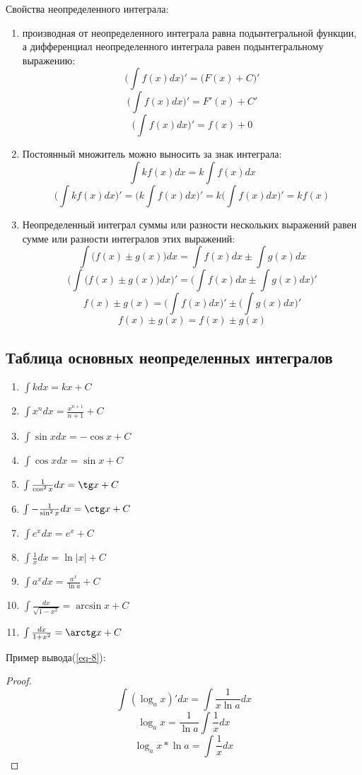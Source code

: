 \documentclass[12pt,a4paper]{article}
\begin{document}
Свойства неопределенного интеграла:
\begin{enumerate}
\item{производная от неопределенного интеграла равна подынтегральной функции, а дифференциал неопределенного интеграла равен подынтегральному выражению:
\[ \Big(\int f(x)dx \Big)' = \big( F(x) + C \big)' \]
\[ \Big( \int f(x)dx \Big)' = F'(x) + C' \]
\[ \Big( \int f(x)dx \Big)' = f(x) + 0 \]
}
\item{
Постоянный множитель можно выносить за знак интеграла:
\[ \int kf(x)dx = k \int f(x)dx \]
\[ \Big(\int kf(x)dx \Big)' = \Big(k \int f(x)dx \Big)' = k \Big( \int f(x)dx \Big)' = kf(x) \]
}
\item{
Неопределенный интеграл суммы или разности нескольких выражений равен сумме или разности интегралов этих выражений:
\[ \int \big(f(x) \pm g(x) \big)dx = \int f(x)dx \pm \int g(x)dx \]
}
\[ \Big(\int \big(f(x) \pm g(x) \big)dx \Big)' = \Big(\int f(x)dx \pm \int g(x)dx \Big)'  \]
\[ f(x) \pm g(x) = \Big(\int f(x)dx \Big)' \pm \Big(\int g(x)dx \Big)' \]
\[ f(x) \pm g(x) = f(x) \pm g(x) \]
\end{enumerate}
\subsection{Таблица основных неопределенных интегралов}

\begin{enumerate}[leftmargin=*, itemsep=0.4ex, before={\everymath{\displaystyle}}]%
\item{
$\int kdx = kx + C$
}
\item{
$\int x^ndx = \frac{x^{n + 1}}{n + 1} + C$
}
\item{
$\int \sin xdx = - \cos x + C$
}
\item{
$\int \cos xdx = \sin x + C$
}
\item{
$\int \frac{1}{\cos^2 x}dx = \tg x + C$
}
\item{
$\int - \frac{1}{\sin^2 x} dx = \ctg x + C$
}
\item{
$\int e^x dx = e^x + C$
}
\item{
$\int \frac{1}{x}dx = \ln |x| + C$
} \label{eq-8}
\item{
$\int a^xdx = \frac{a^x}{\ln a} + C$
}
\item{
$\int \frac{dx}{\sqrt{1 - x^2}} = \arcsin x + C$
}
\item{
$\int \frac{dx}{1 + x^2} = \arctg x + C$
}
\end{enumerate}
 Пример вывода(\ref{eq-8}):
\begin{proof}
\[ \int (\log_{a} x)'dx = \int \frac{1}{x \ln a}dx\]
\[ \log_{a} x = \frac {1}{\ln a} \int \frac{1}{x} dx \]
\[ \log_{a} x * \ln a = \int \frac{1}{x} dx \]
\end{proof}
\end{document}
